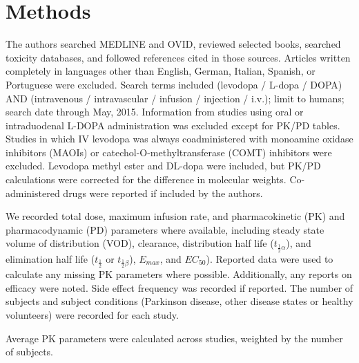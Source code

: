 \section{Methods}
The authors searched MEDLINE and OVID, reviewed selected books, searched toxicity databases, and followed references cited in those sources. Articles written completely in languages other than English, German, Italian, Spanish, or Portuguese were excluded. Search terms included (levodopa / L-dopa / DOPA) AND (intravenous / intravascular / infusion / injection / i.v.); limit to humans; search date through May, 2015. Information from studies using oral or intraduodenal L-DOPA administration was excluded except for PK/PD tables.  Studies in which IV levodopa was always coadministered with monoamine oxidase inhibitors (MAOIs) or catechol-O-methyltransferase (COMT) inhibitors were excluded.  Levodopa methyl ester \cite{3601092} and DL-dopa \cite{14430381} were included, but PK/PD calculations were corrected for the difference in molecular weights.  Co-administered drugs were reported if included by the authors.

We recorded total dose, maximum infusion rate, and pharmacokinetic (PK) and pharmacodynamic (PD) parameters where available, including steady state volume of distribution (VOD), clearance, distribution half life ($t_{\frac{1}{2}\alpha}$), and elimination half life ($t_{\frac{1}{2}}$ or $t_{\frac{1}{2}\beta}$), $E_{max}$, and $EC_{50}$). Reported data were used to calculate any missing PK parameters where possible.  Additionally, any reports on efficacy were noted.  Side effect frequency was recorded if reported. The number of subjects and subject conditions (Parkinson disease, other disease states or healthy volunteers) were recorded for each study. 

Average PK parameters were calculated across studies, weighted by the number of subjects.
  
